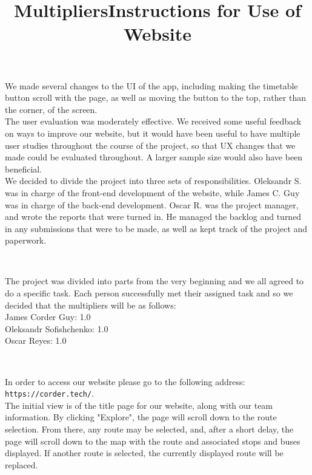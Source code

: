 \documentclass[12pt]{report}
\begin{document}
    We made several changes to the UI of the app, including making the timetable button scroll with the page, as well as moving the button to the top, rather than the corner, of the screen. \\
	
	The user evaluation was moderately effective. We received some useful feedback on ways to improve our website, but it would have been useful to have multiple user studies throughout the course of the project, so that UX changes that we made could be evaluated throughout. A larger sample size would also have been beneficial. \\
	
	We decided to divide the project into three sets of responsibilities. Oleksandr S. was in charge of the front-end development of the website, while James C. Guy was in charge of the back-end development. Oscar R. was the project manager, and wrote the reports that were turned in. He managed the backlog and turned in any submissions that were to be made, as well as kept track of the project and paperwork.



	\begin{center}
		\title{\textbf{Multipliers}} \\
	\end{center}
	The project was divided into parts from the very beginning and we all agreed to do a specific task. Each person successfully met their assigned task and so we decided that the multipliers will be as follows:\\
	James Corder Guy: 1.0\\
	Oleksandr Sofishchenko: 1.0\\
	Oscar Reyes: 1.0\\


	\begin{center}
		\title{\textbf{Instructions for Use of Website}} \\
	\end{center}
	\noindent
    In order to access our website please go to the following address: \texttt{https://corder.tech/}.\\
	
    The initial view is of the title page for our website, along with our team information. By clicking "Explore", the page will scroll down to the route selection. From there, any route may be selected, and, after a short delay, the page will scroll down to the map with the route and associated stops and buses displayed. If another route is selected, the currently displayed route will be replaced. \\
\end{document}
